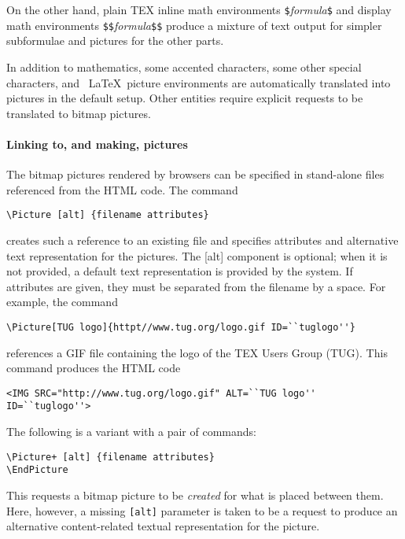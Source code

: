 On the other hand, plain TEX inline math environments
\verb|$|\emph{formula}\verb|$| and
display math environments \verb|$$|\emph{formula}\verb|$$| produce a mixture of text output
for simpler subformulae and pictures for the other parts. 

In addition to mathematics, some accented characters, some other special
characters, and \ \LaTeX\  picture environments are automatically
translated into pictures in the default setup. Other entities require
explicit requests to be translated to bitmap pictures. 

\paragraph{Linking to, and making, pictures}

The bitmap pictures rendered by browsers can be specified in
stand-alone files referenced from the HTML code. The command 

\begin{verbatim}
\Picture [alt] {filename attributes} 
\end{verbatim}

creates such a reference to an existing file and specifies attributes and alternative 
text representation for the pictures. The [alt] component is optional; when it is 
not provided, a default text representation is provided by the system. If attributes 
are given, they must be separated from the filename by a space. 
For example, the command 

\begin{verbatim}
\Picture[TUG logo]{httpt//www.tug.org/logo.gif ID=``tuglogo''} 
\end{verbatim}

references a GIF file containing the logo of the TEX Users Group (TUG). This 
command produces the HTML code 

\begin{verbatim}
<IMG SRC="http://www.tug.org/logo.gif" ALT=``TUG logo'' ID=``tuglogo''> 
\end{verbatim}

The following is a variant with a pair of commands: 

\begin{verbatim}
\Picture+ [alt] {filename attributes} 
\EndPicture 
\end{verbatim}

This requests a bitmap picture to be \emph{created} for what is placed between them. Here, 
however, a missing \verb|[alt]| parameter is taken to be a request to produce an alternative 
content-related textual representation for the picture. 
 
